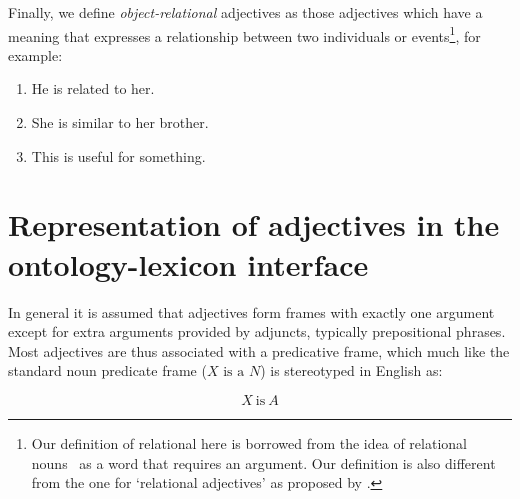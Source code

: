 \documentclass[11pt]{article}
\begin{document}
Finally, we define \emph{object-relational} adjectives as those adjectives which have a meaning 
that expresses a relationship between two individuals or events\footnote{Our definition of relational here is borrowed from the idea of
    relational nouns~\cite{de1988interpretation} as a word that requires an argument. Our definition is also different from the one for `relational adjectives' as proposed by \cite{morzycki2013nonscales}.}, for example:

\begin{enumerate}
\item He is related to her.
\item She is similar to her brother. 
\item This is useful for something. 
\end{enumerate}


\section{Representation of adjectives in the ontology-lexicon interface}

In general it is assumed that adjectives form frames with exactly one argument 
except for extra arguments provided by adjuncts, typically prepositional phrases. 
Most adjectives are thus associated with a predicative frame, which much
like the standard noun predicate frame ($X\text{ is a }N$) is stereotyped in English as:

\vspace{-1.0em}
$$X\mathrm{~is~}A$$
\vspace{-1.5em}
\end{document}
